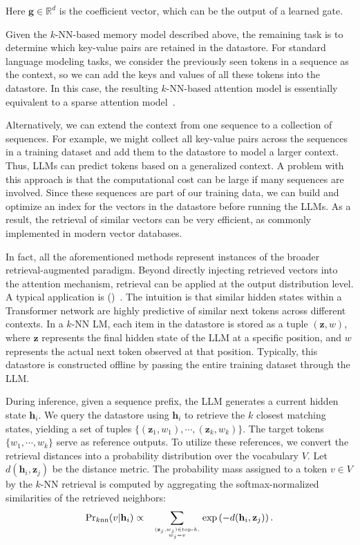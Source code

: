 \noindent Here $\mathbf{g} \in \mathbb{R}^{d}$ is the coefficient vector, which can be the output of a learned gate.

Given the $k$-NN-based memory model described above, the remaining task is to determine which key-value pairs are retained in the datastore. For standard language modeling tasks, we consider the previously seen tokens in a sequence as the context, so we can add the keys and values of all these tokens into the datastore. In this case, the resulting $k$-NN-based attention model is essentially equivalent to a sparse attention model~\cite{gupta-etal:2021memory}.

Alternatively, we can extend the context from one sequence to a collection of sequences. For example, we might collect all key-value pairs across the sequences in a training dataset and add them to the datastore to model a larger context. Thus, LLMs can predict tokens based on a generalized context. A problem with this approach is that the computational cost can be large if many sequences are involved. Since these sequences are part of our training data, we can build and optimize an index for the vectors in the datastore before running the LLMs. As a result, the retrieval of similar vectors can be very efficient, as commonly implemented in modern vector databases.

In fact, all the aforementioned methods represent instances of the broader retrieval-augmented paradigm. Beyond directly injecting retrieved vectors into the attention mechanism, retrieval can be applied at the output distribution level. A typical application is  ()~\cite{khandelwal-etal:2020generalization}. The intuition is that similar hidden states within a Transformer network are highly predictive of similar next tokens across different contexts. In a $k$-NN LM, each item in the datastore is stored as a tuple $(\mathbf{z},w)$, where $\mathbf{z}$ represents the final hidden state of the LLM at a specific position, and $w$ represents the actual next token observed at that position. Typically, this datastore is constructed offline by passing the entire training dataset through the LLM.

During inference, given a sequence prefix, the LLM generates a current hidden state $\mathbf{h}_i$. We query the datastore using $\mathbf{h}_i$ to retrieve the $k$ closest matching states, yielding a set of tuples $\{(\mathbf{z}_1,w_1),\cdots,(\mathbf{z}_k,w_k)\}$. The target tokens $\{w_1,\cdots,w_k\}$ serve as reference outputs. To utilize these references, we convert the retrieval distances into a probability distribution over the vocabulary $V$. Let $d(\mathbf{h}_i, \mathbf{z}_j)$ be the distance metric. The probability mass assigned to a token $v \in V$ by the $k$-NN retrieval is computed by aggregating the softmax-normalized similarities of the retrieved neighbors:
\begin{eqnarray}
\mathrm{Pr}_{k\mathrm{nn}}(v|\mathbf{h}_i) & \propto & \sum_{(\mathbf{z}_j, w_j) \in \text{top-}k, \atop w_j = v} \exp\left(-d(\mathbf{h}_i, \mathbf{z}_j)\right). \label{eq:knn-lm-dist}
\end{eqnarray}

